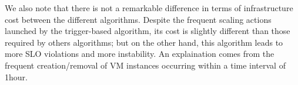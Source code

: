 
We also note that there is not a remarkable difference in terms of infrastructure cost between the 
different algorithms. Despite the frequent scaling actions launched by the trigger-based algorithm, its cost is slightly different than those required by others algorithms; but on the other hand, this algorithm leads to more SLO violations and more
instability. An explaination comes from the frequent creation/removal of VM instances occurring within a time interval of 1hour.




	
